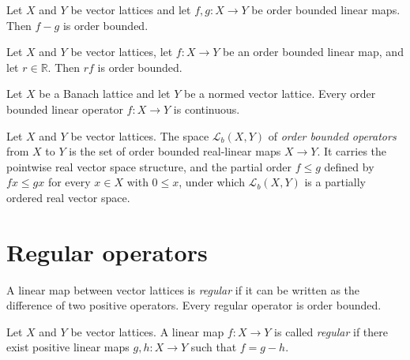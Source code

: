 \begin{lemma}
\label{lem:isOrderBounded-sub}
\leanok
{}
Let $X$ and $Y$ be vector lattices and let $f, g \colon X \to Y$
be order bounded linear maps. Then $f - g$ is order bounded.
\end{lemma}

\begin{lemma}
\label{lem:isOrderBounded-smul}
\leanok
{}
Let $X$ and $Y$ be vector lattices, let $f \colon X \to Y$ be an
order bounded linear map, and let $r \in \mathbb{R}$. Then $r f$
is order bounded.
\end{lemma}

\begin{theorem}
\label{thm:isOrderBounded-continuous}
\leanok
{}
Let $X$ be a Banach lattice and let $Y$ be a normed vector
lattice. Every order bounded linear operator $f \colon X \to Y$
is continuous.
\end{theorem}

\begin{definition}
\label{def:orderBoundedHom}
\leanok
{}
Let $X$ and $Y$ be vector lattices. The space $\mathcal{L}_b(X,
Y)$ of \emph{order bounded operators} from $X$ to $Y$ is the set
of order bounded real-linear maps $X \to Y$. It carries the
pointwise real vector space structure, and the partial order
$f \le g$ defined by $f x \le g x$ for every $x \in X$ with $0
\le x$, under which $\mathcal{L}_b(X, Y)$ is a partially ordered
real vector space.
\end{definition}

\section{Regular operators}

A linear map between vector lattices is \emph{regular} if it can
be written as the difference of two positive operators. Every
regular operator is order bounded.

\begin{definition}
\label{def:isRegularOp}
\leanok
{}
Let $X$ and $Y$ be vector lattices. A linear map $f \colon X \to
Y$ is called \emph{regular} if there exist positive linear maps
$g, h \colon X \to Y$ such that $f = g - h$.
\end{definition}


